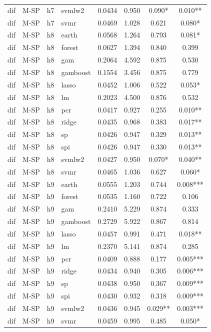 \begin{ThreePartTable}
\begin{longtable}[t]{llclcccc}
dif & M-SP & h7 & svmlw2 & 0.0434 & 0.950 & 0.090* & 0.010**\\
dif & M-SP & h7 & svmr & 0.0469 & 1.028 & 0.621 & 0.080*\\
\addlinespace
dif & M-SP & h8 & earth & 0.0568 & 1.264 & 0.793 & 0.081*\\
dif & M-SP & h8 & forest & 0.0627 & 1.394 & 0.840 & 0.399\\
dif & M-SP & h8 & gam & 0.2064 & 4.592 & 0.875 & 0.530\\
dif & M-SP & h8 & gamboost & 0.1554 & 3.456 & 0.875 & 0.779\\
dif & M-SP & h8 & lasso & 0.0452 & 1.006 & 0.522 & 0.053*\\
dif & M-SP & h8 & lm & 0.2023 & 4.500 & 0.876 & 0.532\\
dif & M-SP & h8 & pcr & 0.0417 & 0.927 & 0.255 & 0.010**\\
dif & M-SP & h8 & ridge & 0.0435 & 0.968 & 0.383 & 0.017**\\
dif & M-SP & h8 & sp & 0.0426 & 0.947 & 0.329 & 0.013**\\
dif & M-SP & h8 & spi & 0.0426 & 0.947 & 0.330 & 0.013**\\
dif & M-SP & h8 & svmlw2 & 0.0427 & 0.950 & 0.070* & 0.040**\\
dif & M-SP & h8 & svmr & 0.0465 & 1.036 & 0.627 & 0.060*\\
\addlinespace
dif & M-SP & h9 & earth & 0.0555 & 1.203 & 0.744 & 0.008***\\
dif & M-SP & h9 & forest & 0.0535 & 1.160 & 0.722 & 0.106\\
dif & M-SP & h9 & gam & 0.2410 & 5.229 & 0.874 & 0.333\\
dif & M-SP & h9 & gamboost & 0.2729 & 5.922 & 0.867 & 0.814\\
dif & M-SP & h9 & lasso & 0.0457 & 0.991 & 0.471 & 0.018**\\
dif & M-SP & h9 & lm & 0.2370 & 5.141 & 0.874 & 0.285\\
dif & M-SP & h9 & pcr & 0.0409 & 0.888 & 0.177 & 0.005***\\
dif & M-SP & h9 & ridge & 0.0434 & 0.940 & 0.305 & 0.006***\\
dif & M-SP & h9 & sp & 0.0438 & 0.950 & 0.367 & 0.009***\\
dif & M-SP & h9 & spi & 0.0430 & 0.932 & 0.318 & 0.009***\\
dif & M-SP & h9 & svmlw2 & 0.0436 & 0.945 & 0.029** & 0.003***\\
dif & M-SP & h9 & svmr & 0.0459 & 0.995 & 0.485 & 0.050*\\

\end{longtable}
\end{ThreePartTable}
